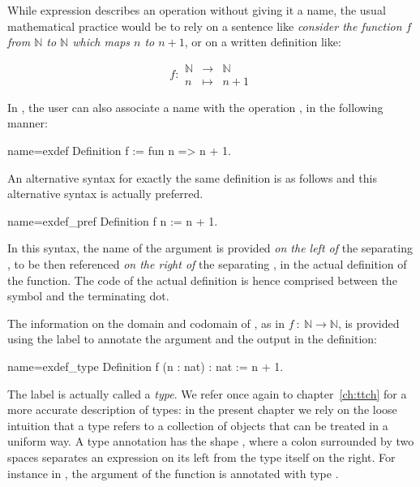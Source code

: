 While expression  describes an operation
without giving it a name, the usual mathematical practice would be to
rely on a sentence like {\em consider the function \(f\) from {\(\mathbb{N}\)}
to {\(\mathbb{N}\)} which maps \(n\) to \(n + 1\)}, or on a written
definition like:

\begin{equation}\label{equation:f}
f :
\begin{array}{ccc}
{\mathbb{N}} &\rightarrow& {\mathbb{N}}\\
n &\mapsto& n + 1
\end{array}
\end{equation}

In \Coq{}, the user can also associate a name with the operation
, in the following manner:

\begin{coq}{name=exdef}{}
Definition f := fun n => n + 1.
\end{coq}
An alternative syntax for exactly the same definition is as follows
and this alternative syntax is actually preferred.

\begin{coq}{name=exdef_pref}{}
Definition f n := n + 1.
\end{coq}

In this syntax, the name of the argument  is provided
\emph{on the left of} the separating \C{:=}, to be then referenced
\emph{on the right of} the separating \C{:=}, in the actual
definition of the function. The code of the actual definition is
hence comprised between the \C{:=} symbol and the terminating dot.

The information on the domain and codomain of ,
as in \(f\ :\ {\mathbb{N}}\rightarrow{\mathbb{N}}\), is provided using
the  label to annotate the argument and the output in the
\Coq{} definition:

\begin{coq}{name=exdef_type}{}
Definition f (n : nat) : nat := n + 1.
\end{coq}
The label  is actually called a {\em type}.
We refer once again to chapter~\ref{ch:ttch} for a more accurate
description of types: in the present chapter we rely on the loose intuition
that a type refers to a collection of objects that can be treated in a
uniform way. A type annotation has the shape , where a colon
\C{:} surrounded by two spaces separates an expression  on its
left from the type  itself on the right. For instance in
, the argument  of the function  is annotated with
type .

